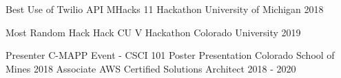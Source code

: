 

\begin{cvhonors}

  \cvhonor
    {Best Use of Twilio API} %
    {MHacks 11 Hackathon}
    {University of Michigan} %
    {2018} %

  \cvhonor
    {Most Random Hack} %
    {Hack CU V Hackathon}
    {Colorado University} %
    {2019} %

    \cvhonor
    {Presenter} %
    {C-MAPP Event - CSCI 101 Poster Presentation}
    {Colorado School of Mines} %
    {2018} %
  \cvhonor
    {Associate} %
    {AWS Certified Solutions Architect }
    {} %
    {2018 - 2020} %
    
\end{cvhonors}
